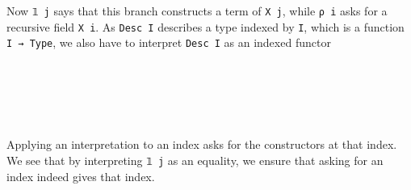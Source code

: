 Now \texttt{𝟙 j} says that this branch constructs a term of \texttt{X j}, while \texttt{ρ i} asks for a recursive field \texttt{X i}. As \texttt{Desc I} describes a type indexed by \texttt{I}, which is a function \texttt{I → Type}, we also have to interpret \texttt{Desc I} as an indexed functor 
\begin{code}%
%
\>[2]\AgdaSpace{}%
\AgdaSymbol{:}\AgdaSpace{}%
\AgdaSpace{}%
\AgdaSpace{}%
\AgdaSpace{}%
\AgdaSymbol{(}\AgdaSpace{}%
\AgdaSpace{}%
\AgdaSymbol{)}\AgdaSpace{}%
\AgdaSpace{}%
\AgdaSymbol{(}\AgdaSpace{}%
\AgdaSpace{}%
\AgdaSymbol{)}\<%
\\
%
\>[2]\AgdaSpace{}%
\AgdaSpace{}%
%
\>[11]\AgdaSpace{}%
\AgdaSpace{}%
\AgdaSpace{}%
\AgdaSymbol{=}\AgdaSpace{}%
\AgdaSpace{}%
\AgdaSpace{}%
\<%
\\
%
\>[2]\AgdaSpace{}%
\AgdaSpace{}%
\AgdaSpace{}%
%
\>[11]\AgdaSpace{}%
\AgdaSpace{}%
\AgdaSpace{}%
\AgdaSymbol{=}\AgdaSpace{}%
\AgdaSpace{}%
\AgdaSpace{}%
\AgdaSpace{}%
\AgdaSpace{}%
\AgdaSpace{}%
\AgdaSpace{}%
\AgdaSpace{}%
\<%
\\
%
\>[2]\AgdaSpace{}%
\AgdaSpace{}%
\AgdaSpace{}%
%
\>[11]\AgdaSpace{}%
\AgdaSpace{}%
\AgdaSpace{}%
\AgdaSymbol{=}\AgdaSpace{}%
\AgdaFunction{Σ[}\AgdaSpace{}%
\AgdaSpace{}%
\AgdaSpace{}%
\AgdaSpace{}%
\AgdaFunction{]}\AgdaSpace{}%
\AgdaSpace{}%
\AgdaSpace{}%
\AgdaSpace{}%
\AgdaSpace{}%
\AgdaSpace{}%
\<%
\\
%
\>[2]\AgdaSpace{}%
\AgdaSpace{}%
\AgdaSpace{}%
%
\>[11]\AgdaSpace{}%
\AgdaSpace{}%
\AgdaSpace{}%
\AgdaSymbol{=}\AgdaSpace{}%
\AgdaSpace{}%
\AgdaSpace{}%
\AgdaSpace{}%
\AgdaSpace{}%
\AgdaSpace{}%
\AgdaSpace{}%
\AgdaSpace{}%
\AgdaSpace{}%
\AgdaSpace{}%
\AgdaSpace{}%
\<%
\end{code}
Applying an interpretation to an index asks for the constructors at that index. We see that by interpreting \texttt{𝟙 j} as an equality, we ensure that asking for an index indeed gives that index.

